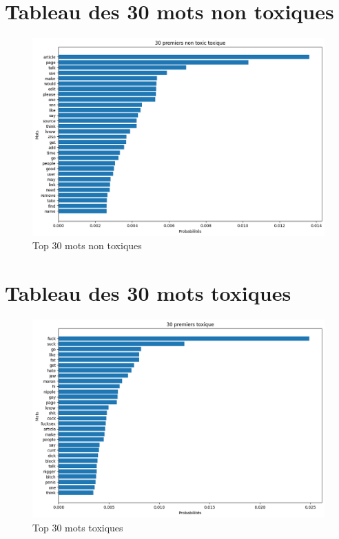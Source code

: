 \section{Tableau des 30 mots non toxiques}
    \begin{figure}[htbp]
        \centering
        \includegraphics[width=.7\linewidth]{figures/30_first_non_toxic-naive_bayes.png}
        \caption{Top 30 mots non toxiques}
    \end{figure}
    \section{Tableau des 30 mots toxiques}
    \begin{figure}[htbp]
        \centering
        \includegraphics[width=.7\linewidth]{figures/30_first_toxic-naive_bayes.png}
        \caption{Top 30 mots toxiques}
    \end{figure}